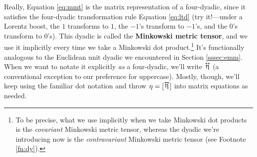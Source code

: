 \documentclass[12pt]{article}
\newcommand{\tightoverset}[2]{%
  \mathop{#2}\limits^{\vbox to -.5ex{\kern-0.75ex\hbox{$#1$}\vss}}}
\newcommand{\inlinedy}[1]{\tightoverset{\text{\tiny$\bm\leftrightarrow$}}{#1}}
\begin{document}
Really, Equation \ref{eq:mmt} is the matrix representation of a four-dyadic, since it satisfies the four-dyadic transformation rule Equation \ref{eq:ltd} (try it!---under a Lorentz boost, the $1$ transforms to $1$, the $-1$'s transform to $-1$'s, and the $0$'s transform to $0$'s). This dyadic is called the \textbf{Minkowski metric tensor}, and we use it implicitly every time we take a Minkowski dot product.\footnote{To be precise, what we use implicitly when we take Minkowski dot products is the \emph{covariant} Minkowski metric tensor, whereas the dyadic we're introducing now is the \emph{contravariant} Minkowski metric tensor (see Footnote \ref{fn:dy}).} It's functionally analogous to the Euclidean unit dyadic we encountered in Section \ref{sssec:emm}. When we want to notate it explicitly \emph{as} a four-dyadic, we'll write $\inlinedy{\upeta}$ (a conventional exception to our preference for uppercase). Mostly, though, we'll keep using the familiar dot notation and throw $\eta = [ \mkern1mu \inlinedy{\upeta} \mkern.5mu ]$ into matrix equations as needed.
\end{document}
